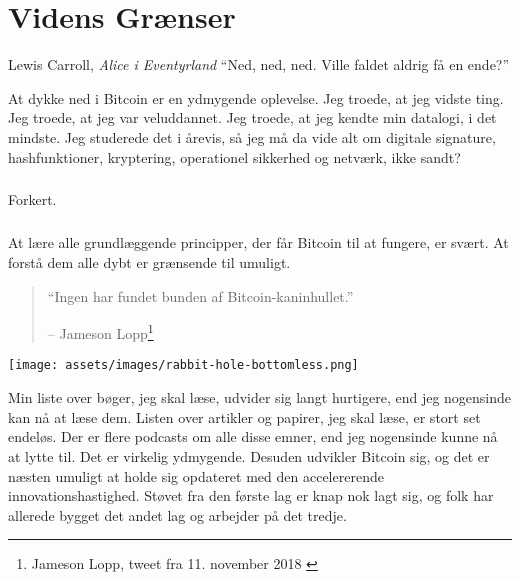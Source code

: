 \chapter{Videns Grænser}
\label{les:7}

\begin{chapquote}{Lewis Carroll, \textit{Alice i Eventyrland}}
\enquote{Ned, ned, ned. Ville faldet aldrig få en ende?}
\end{chapquote}

At dykke ned i Bitcoin er en ydmygende oplevelse. Jeg troede, at jeg vidste 
ting. Jeg troede, at jeg var veluddannet. Jeg troede, at jeg kendte min 
datalogi, i det mindste. Jeg studerede det i årevis, så jeg må da vide alt om 
digitale signature, hashfunktioner, kryptering, operationel sikkerhed og 
netværk, ikke sandt?

\paragraph{}
Forkert.

\paragraph{}
At lære alle grundlæggende principper, der får Bitcoin til at fungere, er 
svært. At forstå dem alle dybt er grænsende til umuligt.

\begin{quotation}\begin{samepage}
\enquote{Ingen har fundet bunden af Bitcoin-kaninhullet.}
\begin{flushright} -- Jameson Lopp\footnote{Jameson Lopp, tweet fra 11.
    november 2018 \cite{lopp-tweet}}
\end{flushright}\end{samepage}\end{quotation}

\begin{center}
    \centering
    \texttt{[image: assets/images/rabbit-hole-bottomless.png]}
    \label{fig:rabbit-hole-bottomless}
\end{center}

Min liste over bøger, jeg skal læse, udvider sig langt hurtigere, end jeg 
nogensinde kan nå at læse dem. Listen over artikler og papirer, jeg skal 
læse, er stort set endeløs. Der er flere podcasts om alle disse emner, end 
jeg nogensinde kunne nå at lytte til. Det er virkelig ydmygende. Desuden 
udvikler Bitcoin sig, og det er næsten umuligt at holde sig opdateret med den 
accelererende innovationshastighed. Støvet fra den første lag er knap nok lagt 
sig, og folk har allerede bygget det andet lag og arbejder på det tredje.


